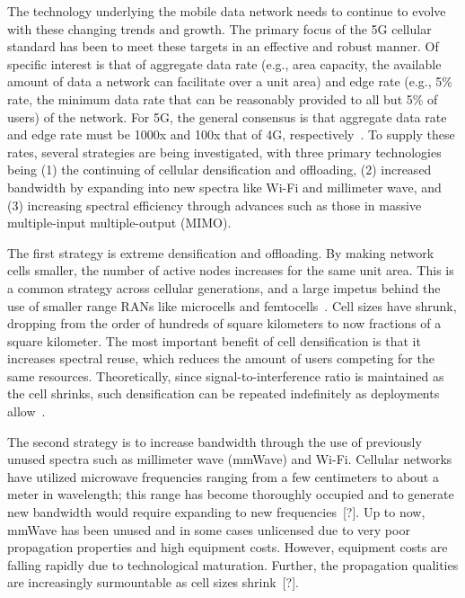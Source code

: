 \documentclass[12pt,dvipsnames]{report}
\begin{document}
The technology underlying the mobile data network needs to continue to evolve with these changing trends and growth.  The primary focus of the 5G cellular standard has been to meet these targets in an effective and robust manner.  Of specific interest is that of aggregate data rate (e.g., area capacity, the available amount of data a network can facilitate over a unit area) and edge rate (e.g., 5\% rate, the minimum data rate that can be reasonably provided to all but 5\% of users) of the network.  For 5G, the general consensus is that aggregate data rate and edge rate must be 1000x and 100x that of 4G, respectively~\cite{6824752}.  To supply these rates, several strategies are being investigated, with three primary technologies being (1) the continuing of cellular densification and offloading, (2) increased bandwidth by expanding into new spectra like Wi-Fi and millimeter wave, and (3) increasing spectral efficiency through advances such as those in massive multiple-input multiple-output (MIMO).


The first strategy is extreme densification and offloading.  By making network cells smaller, the number of active nodes increases for the same unit area.  This is a common strategy across cellular generations, and a large impetus behind the use of smaller range RANs like microcells and femtocells~\cite{4623708}.  Cell sizes have shrunk, dropping from the order of hundreds of square kilometers to now fractions of a square kilometer.  The most important benefit of cell densification is that it increases spectral reuse, which reduces the amount of users competing for the same resources.  Theoretically, since signal-to-interference ratio is maintained as the cell shrinks, such densification can be repeated indefinitely as deployments allow~\cite{6824752, 6171996}.

The second strategy is to increase bandwidth through the use of previously unused spectra such as millimeter wave (mmWave) and Wi-Fi.  Cellular networks have utilized microwave frequencies ranging from a few centimeters to about a meter in wavelength; this range has become thoroughly occupied and to generate new bandwidth would require expanding to new frequencies~[?].  Up to now, mmWave has been unused and in some cases unlicensed due to very poor propagation properties and high equipment costs.  However, equipment costs are falling rapidly due to technological maturation.  Further, the propagation qualities are increasingly surmountable as cell sizes shrink~[?].
\end{document}
